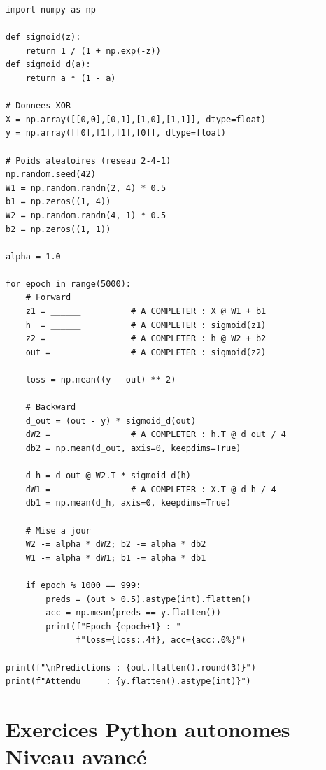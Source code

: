 \begin{pythonbox}
\begin{lstlisting}
import numpy as np

def sigmoid(z):
    return 1 / (1 + np.exp(-z))
def sigmoid_d(a):
    return a * (1 - a)

# Donnees XOR
X = np.array([[0,0],[0,1],[1,0],[1,1]], dtype=float)
y = np.array([[0],[1],[1],[0]], dtype=float)

# Poids aleatoires (reseau 2-4-1)
np.random.seed(42)
W1 = np.random.randn(2, 4) * 0.5
b1 = np.zeros((1, 4))
W2 = np.random.randn(4, 1) * 0.5
b2 = np.zeros((1, 1))

alpha = 1.0

for epoch in range(5000):
    # Forward
    z1 = ______          # A COMPLETER : X @ W1 + b1
    h  = ______          # A COMPLETER : sigmoid(z1)
    z2 = ______          # A COMPLETER : h @ W2 + b2
    out = ______         # A COMPLETER : sigmoid(z2)

    loss = np.mean((y - out) ** 2)

    # Backward
    d_out = (out - y) * sigmoid_d(out)
    dW2 = ______         # A COMPLETER : h.T @ d_out / 4
    db2 = np.mean(d_out, axis=0, keepdims=True)

    d_h = d_out @ W2.T * sigmoid_d(h)
    dW1 = ______         # A COMPLETER : X.T @ d_h / 4
    db1 = np.mean(d_h, axis=0, keepdims=True)

    # Mise a jour
    W2 -= alpha * dW2; b2 -= alpha * db2
    W1 -= alpha * dW1; b1 -= alpha * db1

    if epoch % 1000 == 999:
        preds = (out > 0.5).astype(int).flatten()
        acc = np.mean(preds == y.flatten())
        print(f"Epoch {epoch+1} : "
              f"loss={loss:.4f}, acc={acc:.0%}")

print(f"\nPredictions : {out.flatten().round(3)}")
print(f"Attendu     : {y.flatten().astype(int)}")
\end{lstlisting}
\end{pythonbox}

\section*{Exercices Python autonomes --- Niveau avanc\'{e}}


